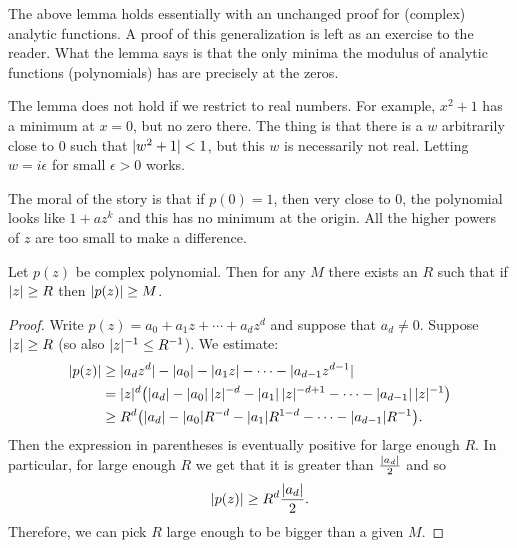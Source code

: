\begin{remark}
The above lemma holds essentially with an unchanged proof for (complex) analytic
functions.  A proof of this generalization is left as an exercise to the reader.
What the lemma
says is that the only minima the modulus of analytic functions (polynomials)
has are precisely at the zeros.
\end{remark}

\begin{remark}
The lemma does not hold if we restrict to real numbers.  For
example, $x^2+1$ has a minimum at $x=0$, but no zero there.  The thing is that
there is a $w$ arbitrarily close to $0$ such that $\lvert {w^2+1} \rvert < 1$, but this
$w$ is necessarily not real.  Letting $w = i\epsilon$ for small
$\epsilon > 0$ works.
\end{remark}

The moral of the story is that if $p(0) = 1$, then very close to 0, the
polynomial
looks like $1+az^k$ and this has no minimum at the origin.  All the higher
powers of $z$ are too small to make a difference.

\begin{lemma}
Let $p(z)$ be complex polynomial.  Then for any $M$ there exists
an $R$ such that if $\lvert {z} \rvert \geq R$ then $\lvert {p(z)} \rvert \geq M$.
\end{lemma}

\begin{proof}
Write $p(z) = a_0 + a_1 z + \cdots + a_d z^d$ and suppose that
$a_d \not= 0$.
Suppose $\lvert {z} \rvert \geq R$ (so also $\lvert {z} \rvert^{-1} \leq R^{-1}$).
We estimate:
\begin{equation*}
\begin{split}
\lvert {p(z)} \rvert
& \geq
\lvert {a_d z^d} \rvert -
\lvert {a_0} \rvert - \lvert {a_1 z} \rvert - \cdots - \lvert {a_{d-1} z^{d-1} } \rvert
\\
& =
\lvert {z} \rvert^d \bigl(
\lvert {a_d} \rvert -
\lvert {a_0} \rvert \, \lvert {z} \rvert^{-d} -
\lvert {a_1} \rvert \, \lvert {z} \rvert^{-d+1} - \cdots - \lvert {a_{d-1}} \rvert \, \lvert {z} \rvert^{-1}
\bigr)
\\
& \geq
R^d \bigl(\lvert {a_d} \rvert -
\lvert {a_0} \rvert R^{-d} - \lvert {a_1} \rvert R^{1-d} - \cdots - \lvert {a_{d-1}} \rvert R^{-1} \bigr)
.
\end{split}
\end{equation*}
Then the expression in parentheses is eventually positive for large enough
$R$.  In particular, for large enough $R$ we get that it is greater than
$\frac{\lvert {a_d} \rvert}{2}$ and so
\begin{equation*}
\lvert {p(z)} \rvert
\geq
R^d \frac{\lvert {a_d} \rvert}{2} .
\end{equation*}
Therefore,
we can pick $R$ large enough to be bigger than a given $M$.
\end{proof}

